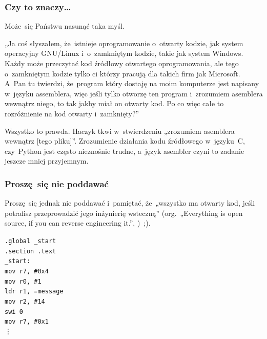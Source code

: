 \documentclass[10pt,t]{beamer}
\begin{document}
\begin{frame}
  \frametitle{Czy to znaczy\ldots}


  Może~się Państwu nasunąć taka myśl.

  „Ja coś słyszałem, że~istnieje oprogramowanie o~otwarty kodzie, jak
  system operacyjny GNU/Linux i~o~zamkniętym kodzie, takie jak system
  Windows. Każdy może przeczytać kod źródłowy otwartego oprogramowania,
  ale tego o~zamkniętym kodzie tylko ci którzy pracują dla takich firm jak
  Microsoft. A~Pan tu twierdzi, że~program który dostaję na moim komputerze
  jest napisany w~języku assemblera, więc jeśli tylko otworzę ten program
  i~zrozumiem asemblera wewnątrz niego, to tak jakby miał on otwarty kod.
  Po co więc całe to rozróżnienie na kod otwarty i~zamknięty?”

  Wszystko to prawda. Haczyk tkwi w~stwierdzeniu \alert{„zrozumiem asemblera
    wewnątrz [tego pliku]”}. Zrozumienie działania kodu źródłowego
  w~języku~C, czy~Python jest często nieznośnie trudne, a~język asembler
  czyni to zadanie jeszcze mniej przyjemnym.

\end{frame}





\begin{frame}
  \frametitle{Proszę~się nie poddawać}


  Proszę~się jednak nie poddawać i~pamiętać, że~„wszystko ma otwarty
  kod, jeśli potrafisz przeprowadzić jego inżynierię wsteczną”
  (org.~„Everything is open source, if you can reverse engineering it.”,
  \parencite{Low-Level-Learning-Everything-is-open-source-if-ETC-Ver-2023})~;).

  \vspace{1.5em}





  \texttt{.global \_start} \\
  \texttt{.section .text} \\



  \texttt{\_start:} \\[-0.2em]
  \hphantom{aaaaaaaa} \texttt{mov r7, \#0x4} \\
  \hphantom{aaaaaaaa} \texttt{mov r0, \#1} \\
  \hphantom{aaaaaaaa} \texttt{ldr r1, =message} \\
  \hphantom{aaaaaaaa} \texttt{mov r2, \#14} \\

  \hphantom{aaaaaaaa} \texttt{swi 0} \\

  \hphantom{aaaaaaaa} \texttt{mov r7, \#0x1} \\
  \hspace{5em} \vdots

\end{frame}
\end{document}
